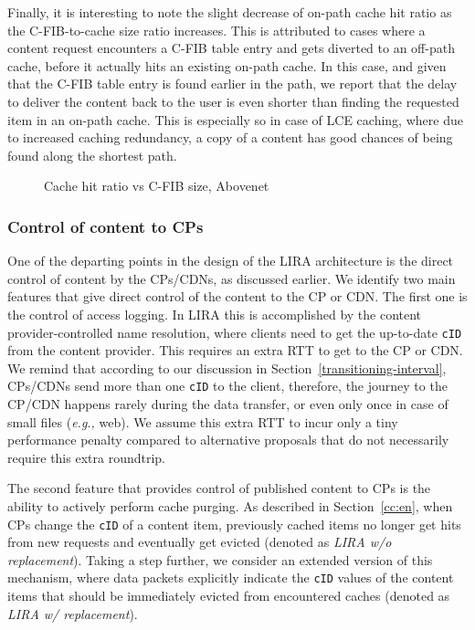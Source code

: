 \documentclass{sig-alternate}
\newcommand{\eg}{{\em e.g.,\/ }}
\begin{document}
Finally, it is interesting to note the slight decrease of on-path cache hit ratio as the C-FIB-to-cache size ratio increases.
This is attributed to cases where a content request encounters a C-FIB table entry and gets diverted to an off-path cache, before it actually hits an existing on-path cache.
In this case, and given that the C-FIB table entry is found earlier in the path, we report that the delay to deliver the content back to the user is even shorter than finding the requested item in an on-path cache.
This is especially so in case of LCE caching, where due to increased caching redundancy, a copy of a content has good chances of being found along the shortest path.


\begin{figure}[h]
\centering
{}
\vspace{-0.1cm}
    	\caption{Cache hit ratio vs C-FIB size, Abovenet}
    	\label{hits-vs-C-FIB}
\end{figure}


\subsubsection{Control of content to CPs}

One of the departing points in the design of the LIRA architecture is the direct control of content by the CPs/CDNs, as discussed earlier. We identify two main features that give direct control of the content to the CP or CDN. The first one is the control of access logging. In LIRA this is accomplished by the content provider-controlled name resolution, where clients need to get the up-to-date \texttt{cID} from the content provider. This requires an extra RTT to get to the CP or CDN. We remind that according to our discussion in Section~\ref{transitioning-interval}, CPs/CDNs send more than one \texttt{cID} to the client, therefore, the journey to the CP/CDN happens rarely during the data transfer, or even only once in case of small files (\eg web). We assume this extra RTT to incur only a tiny performance penalty compared to alternative proposals that do not necessarily require this extra roundtrip.

The second feature that provides control of published content to CPs is the ability to actively perform cache purging. As described in Section~\ref{cc:en}, when CPs change the \texttt{cID} of a content item, previously cached items no longer get hits from new requests and eventually get evicted (denoted as \textit{LIRA w/o replacement}). 
Taking a step further, we consider an extended version of this mechanism, where data packets explicitly indicate the \texttt{cID} values of the content items that should be immediately evicted from encountered caches (denoted as \textit{LIRA w/ replacement}).
\end{document}
